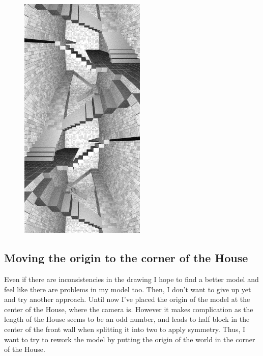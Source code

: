 \documentclass[12pt, a4paper]{article}
\begin{document}
\begin{center}
\begin{figure}[H]
\centering
\includegraphics[width=6cm]{./XL-51_11.png}\\
\end{figure}
\end{center}

\subsection{Moving the origin to the corner of the House}

Even if there are inconsistencies in the drawing I hope to find a better model and feel like there are problems in my model too. Then, I don't want to give up yet and try another approach. Until now I've placed the origin of the model at the center of the House, where the camera is. However it makes complication as the length of the House seems to be an odd number, and leads to half block in the center of the front wall when splitting it into two to apply symmetry. Thus, I want to try to rework the model by putting the origin of the world in the corner of the House.
\end{document}
